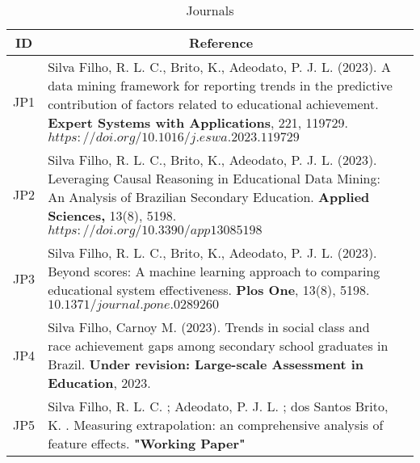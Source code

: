 \begin{table}[ht]
\caption{Journals}
\label{tbl:journals}
\centering
{}
\begin{tabular}{p{1cm}p{14cm}p{1cm}}
\hline
\multicolumn{1}{c}{\textbf{ID}} & \multicolumn{1}{c}{\textbf{Reference}}\\
\hline     
JP1 & Silva Filho, R. L. C., Brito, K., Adeodato, P. J. L. (2023). A data mining framework for reporting trends in the predictive contribution of factors related to educational achievement. \textbf{Expert Systems with Applications}, 221, 119729. $https://doi.org/10.1016/j.eswa.2023.119729$
\\ 
JP2 & Silva Filho, R. L. C., Brito, K., Adeodato, P. J. L. (2023). Leveraging Causal Reasoning in Educational Data Mining: An Analysis of Brazilian Secondary Education. \textbf{Applied Sciences,} 13(8), 5198. $https://doi.org/10.3390/app13085198$
\\ 
JP3 & Silva Filho, R. L. C., Brito, K., Adeodato, P. J. L. (2023). Beyond scores: A machine learning approach to comparing educational system effectiveness. \textbf{Plos One}, 13(8), 5198. $10.1371/journal.pone.0289260$
\\ 
JP4 & Silva Filho, Carnoy M. (2023). Trends in social class and race achievement gaps among secondary school graduates in Brazil. \textbf{Under revision: Large-scale Assessment in Education}, 2023. 
\\ 
JP5 & Silva Filho, R. L. C. ; Adeodato, P. J. L. ; dos Santos Brito, K. . Measuring extrapolation: an comprehensive analysis of feature effects. \textbf{"Working Paper"}
\\ 
\hline

\end{tabular}
\end{table}




